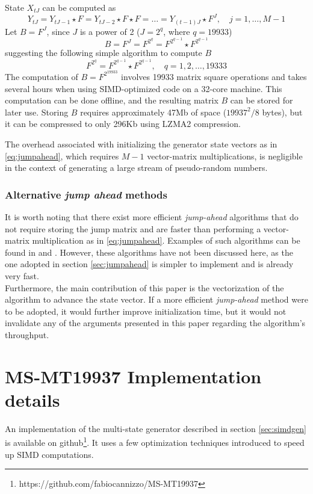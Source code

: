 \documentclass[preprint,1p,times]{elsarticle}
\begin{document}
State $X_{tJ}$ can be computed as
\begin{equation}
\label{eq:jumpahead}
    Y_{tJ} = Y_{tJ-1} \star F = Y_{tJ-2}  \star F \star F = \ldots = Y_{(t-1)J}  \star F^{J}, \quad j=1,\dots,M-1
\end{equation}
Let $B=F^J$, since $J$ is a power of 2 ($J=2^{q}$, where $q=19933$)
$$
    B=F^{J}=F^{2^q}=F^{2^{q-1}} \star F^{2^{q-1}}
$$
suggesting the following simple algorithm to compute $B$
$$
    F^{2^q} = F^{2^{q-1}} \star F^{2^{q-1}}, \quad q=1, 2, \dots, 19333
$$
The computation of $B=F^{2^{19933}}$ involves 19933 matrix square operations and takes several hours when using SIMD-optimized code on a 32-core machine. This computation can be done offline, and the resulting matrix $B$ can be stored for later use. Storing $B$ requires approximately 47Mb of space ($19937^2/8$ bytes), but it can be compressed to only 296Kb using LZMA2 compression.

The overhead associated with initializing the generator state vectors as in \eqref{eq:jumpahead}, which requires $M-1$ vector-matrix multiplications, is negligible in the context of generating a large stream of pseudo-random numbers.

\subsubsection{Alternative \textit{jump ahead} methods}
It is worth noting that there exist more efficient \textit{jump-ahead} algorithms that do not require storing the jump matrix and are faster than performing a vector-matrix multiplication as in \eqref{eq:jumpahead}. Examples of such algorithms can be found in \cite{jump1} and \cite{jump2}. However, these algorithms have not been discussed here, as the one adopted in section \ref{sec:jumpahead} is simpler to implement and is already very fast.\\

Furthermore, the main contribution of this paper is the vectorization of the algorithm to advance the state vector. If a more efficient \textit{jump-ahead} method were to be adopted, it would further improve initialization time, but it would not invalidate any of the arguments presented in this paper regarding the algorithm's throughput.

\section{MS-MT19937 Implementation details}
An implementation of the multi-state generator described in section \ref{sec:simdgen} is available on github\footnote{\label{fn:github} https://github.com/fabiocannizzo/MS-MT19937}. It uses a few optimization techniques introduced to speed up SIMD computations.
\end{document}
